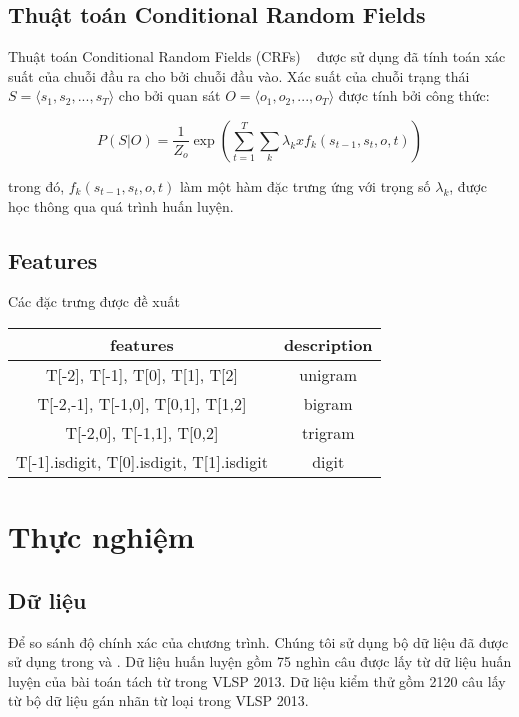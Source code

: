 \documentclass[11pt,a4paper]{article}
\begin{document}
\subsection{Thuật toán Conditional Random Fields}

Thuật toán Conditional Random Fields (CRFs) ~\cite{Lafferty:2001:CRF:645530.655813} được sử dụng đã tính toán xác suất của chuỗi đầu ra cho bởi chuỗi đầu vào. Xác suất của chuỗi trạng thái $S = \langle s_1, s_2,..., s_T \rangle$ cho bởi quan sát $O = \langle o_1, o_2, ..., o_T \rangle$ được tính bởi công thức:

$$P(S|O) = \frac{1}{Z_o} \exp( \sum_{t=1}^{T} \sum_{k} \lambda_k x f_k (s_{t-1},s_t,o,t) )$$

trong đó, $f_k (s_{t-1},s_t,o,t)$ làm một hàm đặc trưng ứng với trọng số $\lambda_k$, được học thông qua quá trình huấn luyện.

\subsection{Features}

Các đặc trưng được đề xuất

\begin{center}
\begin{tabular}{ |c|c| }
 \hline
 features & description \\
 \hline
 T[-2], T[-1], T[0], T[1], T[2] & unigram  \\
 T[-2,-1], T[-1,0], T[0,1], T[1,2] & bigram  \\
 T[-2,0], T[-1,1], T[0,2] & trigram \\
 T[-1].isdigit, T[0].isdigit, T[1].isdigit & digit \\
 \hline
\end{tabular}
\end{center}

\section{Thực nghiệm}

\subsection{Dữ liệu}

Để so sánh độ chính xác của chương trình. Chúng tôi sử dụng bộ dữ liệu đã được sử dụng trong \citet{DBLP:conf/lrec/NguyenNVDJ18} và \citet{7800279}. Dữ liệu huấn luyện gồm 75 nghìn câu được lấy từ dữ liệu huấn luyện của bài toán tách từ trong VLSP 2013. Dữ liệu kiểm thử gồm 2120 câu lấy từ bộ dữ liệu gán nhãn từ loại trong VLSP 2013.
\end{document}
